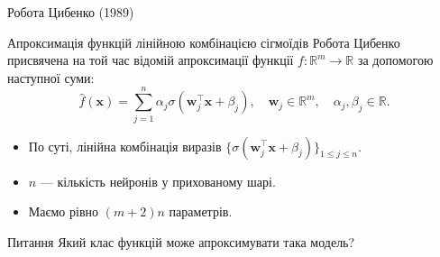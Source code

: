 \documentclass{zkdl-presentation-template}
\begin{document}
    \begin{frame}{Робота Цибенко (1989)}
        \begin{block}{Апроксимація функцій лінійною комбінацією сігмоїдів}
            Робота Цибенко \cite{cybenko} присвячена на той час відомій апроксимації функції $f:
            \mathbb{R}^m \to \mathbb{R}$ за допомогою наступної суми:
            \begin{equation*}\label{eq:cybenko-g}
                \hat{f}(\boldsymbol{x}) = \sum_{j=1}^n \alpha_j \sigma(\boldsymbol{w}_j^{\top}\boldsymbol{x} + \beta_j), \quad \boldsymbol{w}_j \in \mathbb{R}^m, \quad \alpha_j,\beta_j \in \mathbb{R}.
            \end{equation*}
            \begin{itemize}
                \item По суті, лінійна комбінація виразів $\{\sigma(\boldsymbol{w}_j^{\top}\boldsymbol{x} + \beta_j)\}_{1 \leq j \leq n}$.
                \item $n$ --- кількість нейронів у прихованому шарі.
                \item Маємо рівно $(m+2)n$ параметрів.
            \end{itemize}
            
        \end{block}

        \pause\begin{alertblock}{Питання}
            Який клас функцій може апроксимувати така модель?
        \end{alertblock}
    \end{frame}
\end{document}
